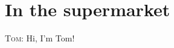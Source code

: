 \documentclass{scrartcl}
\newcommand{\tomx}[1]{
\textsc{Tom:} #1
}
\begin{document}
\section{In the supermarket}
\tomx{Hi, I'm Tom!}
\end{document}
